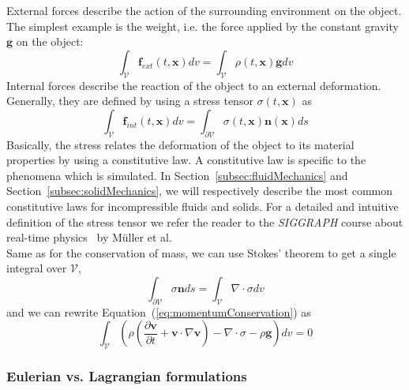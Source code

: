 External forces describe the action of the surrounding environment on the object. 
The simplest example is the weight, i.e. the force applied by the constant gravity $\mathbf{g}$ on the object:
\begin{equation}
\displaystyle \int_{\mathcal{V}} \mathbf{f}_{ext}(t,\mathbf{x})dv = \int_{\mathcal{V}} \rho(t,\mathbf{x}) \mathbf{g} dv
\end{equation}
Internal forces describe the reaction of the object to an external deformation.
Generally, they are defined by using a stress tensor $\sigma(t,\mathbf{x})$ as 
\begin{equation}
\displaystyle 
\int_{\mathcal{V}} \mathbf{f}_{int}(t,\mathbf{x}) dv 
= \int_{\partial \mathcal{V}} \sigma(t,\mathbf{x}) \mathbf{n}(\mathbf{x}) ds
\end{equation}
Basically, the stress relates the deformation of the object to its material properties by using a constitutive law.
A constitutive law is specific to the phenomena which is simulated.
In Section~\ref{subsec:fluidMechanics} and Section~\ref{subsec:solidMechanics}, we will respectively describe the most common constitutive laws for incompressible fluids and solids.
For a detailed and intuitive definition of the stress tensor we refer the reader to the \emph{SIGGRAPH} course about real-time physics~\cite{Muller2008} by M\"{u}ller et al.
\\
Same as for the conservation of mass, we can use Stokes' theorem to get a single integral over $\mathcal{V}$,
\begin{equation}
\displaystyle 
\int_{\mathcal{\partial V}} \sigma \mathbf{n} ds =
\int_{\mathcal{V}} \nabla \cdot \sigma dv
\end{equation}
and we can rewrite Equation~(\ref{eq:momentumConservation}) as
\begin{equation}
\label{eq:volumetricMomentumConservation}
\displaystyle
\int_{\mathcal{V}} 
\left( 
\rho \left( \frac{\partial\mathbf{v}}{\partial t} + \mathbf{v} \cdot \nabla \mathbf{v} \right)
- \nabla \cdot \sigma - \rho \mathbf{g}  \right) dv = 0
\end{equation}

\subsubsection{Eulerian vs. Lagrangian formulations}

